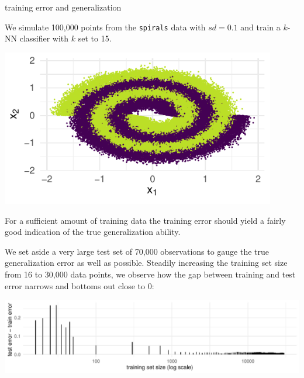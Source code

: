 \begin{vbframe}{training error and generalization}

\begin{minipage}[c]{0.6\textwidth}
  \small
  We simulate 100,000 points from the \texttt{spirals} data with $sd = 0.1$ and 
  train a $k$-NN classifier with $k$ set to 15.
\end{minipage}%
\begin{minipage}[c]{0.05\textwidth}
  \phantom{foo}
\end{minipage}%
\begin{minipage}[c]{0.35\textwidth}
  \includegraphics[width = 0.9\textwidth]{figure/eval_delta_train_test_err_data}
\end{minipage}%

\vfill

\small

For a sufficient amount of training data the training error should yield a 
fairly good indication of the true generalization ability.

\vfill

We set aside a very large test set of 70,000 observations to gauge the true 
generalization error as well as possible.
Steadily increasing the training set size from 16 to 30,000 data points, we 
observe how the gap between training and test error narrows and bottoms 
out close to 0:

\vfill

\includegraphics[width = \textwidth]{figure/eval_delta_train_test_err}


\end{vbframe}
